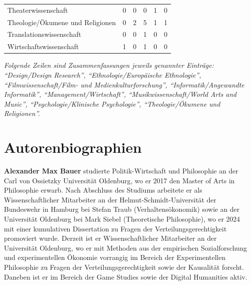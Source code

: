 \documentclass{scrartcl}
\begin{document}
\begin{landscape}
\begin{longtable}{L{7.5cm}ccccc}
Theaterwissenschaft                                  & 0                     &  0                       &  0                       & 1                    & 0                       \\
Theologie/Ökumene und Religionen                     & 0                     &  2                       &  5                       & 1                    & 1                       \\
Translationswissenschaft                             & 0                     &  0                       &  1                       & 0                    & 0                       \\
Wirtschaftswissenschaft                              & 1                     &  0                       &  1                       & 0                    & 0                       \\
\end{longtable}
\noindent\textit{Folgende Zeilen sind Zusammenfassungen jeweils genannter Einträge:
\enquote{Design/Design Research}, \enquote{Ethnologie/Europäische Ethnologie}, \enquote{Filmwissenschaft/Film- und Medienkulturforschung}, \enquote{Informatik/Angewandte Informatik}, \enquote{Management/Wirtschaft}, \enquote{Musikwissenschaft/World Arts and Music}, \enquote{Psychologie/Klinische Psychologie}, \enquote{Theologie/Ökumene und Religionen}.}
\end{landscape}


\clearpage
\section*{Autorenbiographien}
\textbf{\textsf{Alexander Max Bauer}} studierte Politik-Wirtschaft und Philosophie an der Carl von Ossietzky Universität Oldenburg, wo er 2017 den Master of Arts in Philosophie erwarb.
Nach Abschluss des Studiums arbeitete er als Wissenschaftlicher Mitarbeiter an der Helmut-Schmidt-Universität der Bundeswehr in Hamburg bei Stefan Traub (Verhaltensökonomik) sowie an der Universität Oldenburg bei Mark Siebel (Theoretische Philosophie), wo er 2024 mit einer kumulativen Dissertation zu Fragen der Verteilungsgerechtigkeit promoviert wurde.
Derzeit ist er Wissenschaftlicher Mitarbeiter an der Universität Oldenburg, wo er mit Methoden aus der empirischen Sozialforschung und experimentellen Ökonomie vorrangig im Bereich der Experimentellen Philosophie zu Fragen der Verteilungsgerechtigkeit sowie der Kausalität forscht.
Daneben ist er im Bereich der Game Studies sowie der Digital Humanities aktiv.
\end{document}
